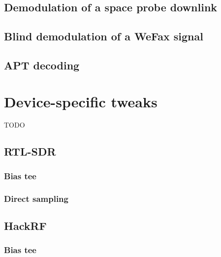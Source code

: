 \documentclass{ol-softwaremanual}
\begin{document}
\section{Demodulation of a space probe downlink}
\section{Blind demodulation of a WeFax signal}
\section{APT decoding}

\chapter{Device-specific tweaks}
TODO
\section{RTL-SDR}
\subsection{Bias tee}
\subsection{Direct sampling}
\section{HackRF}
\subsection{Bias tee}
\end{document}
